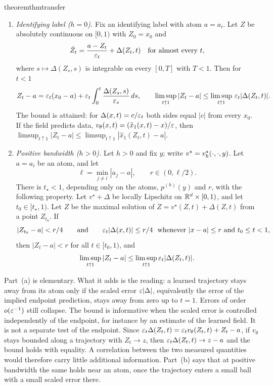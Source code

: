 \documentclass{article} %
\theoremstyle{plain}
\theoremstyle{definition}
\theoremstyle{remark}
\begin{document}
\begin{restatable}{theorem}{thmtransfer}
\label{thm:transfer}
\begin{enumerate}[label=(\alph*),leftmargin=2em]
\item \emph{Identifying label ($h=0$).} Fix an identifying label with atom $a=a_i$. Let $Z$ be
  absolutely continuous on $[0,1)$ with $Z_0=x_0$ and
  \[
  \dot Z_t=\frac{a-Z_t}{\varepsilon_t}+\Delta(Z_t,t)\quad\text{for almost every }t,
  \]
  where $s\mapsto\Delta(Z_s,s)$ is integrable on every $[0,T]$ with $T<1$. Then for $t<1$
  \begin{equation}
  Z_t-a=\varepsilon_t(x_0-a)+\varepsilon_t\int_0^t\frac{\Delta(Z_s,s)}{\varepsilon_s}\,ds,
  \qquad
  \limsup_{t\uparrow1}|Z_t-a|\le\limsup_{t\uparrow1}\,\varepsilon_t|\Delta(Z_t,t)|.
  \label{eq:transfer}
  \end{equation}
  The bound is attained: for $\Delta(x,t)=c/\varepsilon_t$ both sides equal $|c|$ from every $x_0$. If
  the field predicts data, $v_\theta(x,t)=(\hat x_1(x,t)-x)/\varepsilon$, then
  $\limsup_{t\uparrow1}|Z_t-a|\le\limsup_{t\uparrow1}|\hat x_1(Z_t,t)-a|$.
\item \emph{Positive bandwidth ($h>0$).} Let $h>0$ and fix $y$; write $v^\star=v_h^\star(\cdot,\cdot,y)$.
  Let $a=a_i$ be an atom, and let
  \[
  \ell =\min_{j\ne i}|a_j-a|,\qquad r\in(0,\ell /2).
  \]
  There is $t_\star<1$, depending only on the atoms, $p^{(h)}(y)$ and $r$, with the following
  property. Let $v^\star+\Delta$ be locally Lipschitz on $\mathbb{R}^d\times[0,1)$, and let
  $t_0\in[t_\star,1)$. Let $Z$ be the maximal solution of $\dot Z=v^\star(Z,t)+\Delta(Z,t)$ from a
  point $Z_{t_0}$. If
  \[
  |Z_{t_0}-a|<r/4\qquad\text{and}\qquad\varepsilon_t|\Delta(x,t)|\le r/4\ \text{ whenever }|x-a|\le r
  \text{ and }t_0\le t<1,
  \]
  then $|Z_t-a|<r$ for all $t\in[t_0,1)$, and
  \[
  \limsup_{t\uparrow1}|Z_t-a|\le\limsup_{t\uparrow1}\varepsilon_t|\Delta(Z_t,t)|.
  \]
\end{enumerate}
\end{restatable}

Part~(a) is elementary. What it adds is the reading: a learned trajectory stays away from its
atom only if the scaled error $\varepsilon|\Delta|$, equivalently the error of the implied endpoint
prediction, stays away from zero up to $t=1$. Errors of order $o(\varepsilon^{-1})$ still collapse. The
bound is informative when the scaled error is controlled independently of the endpoint, for
instance by an estimate of the learned field. It is not a separate test of the endpoint. Since
$\varepsilon_t\Delta(Z_t,t)=\varepsilon_tv_\theta(Z_t,t)+Z_t-a$, if $v_\theta$ stays bounded along a trajectory with
$Z_t\to z$, then $\varepsilon_t\Delta(Z_t,t)\to z-a$ and the bound holds with equality. A correlation
between the two measured quantities would therefore carry little additional information. Part~(b)
says that at positive bandwidth the same holds near an atom, once the trajectory enters a small ball
with a small scaled error there.
\end{document}
